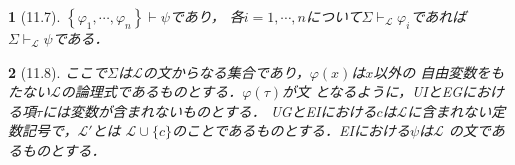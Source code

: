 \documentclass[a4j,10.5pt,oneside,openany]{jsbook}
\theoremstyle{mystyle}
\newtheorem{thm}{\color{DarkMidnightBlue}{定理}}[section]
\begin{document}
	\begin{screen}
		\begin{thm}[11.7]
			$\left\{\varphi_{1},\cdots,\varphi_{n}\right\} \vdash \psi$であり，
			各$i = 1,\cdots,n$について$\Sigma \vdash_{\mathcal{L}} \varphi_{i}$であれば
			$\Sigma \vdash_{\mathcal{L}} \psi$である．
		\end{thm}
	\end{screen}
	
	\begin{screen}
		\begin{thm}[11.8]
			ここで$\Sigma$は$\mathcal{L}$の文からなる集合であり，$\varphi(x)$は$x$以外の
			自由変数をもたない$\mathcal{L}$の論理式であるものとする．$\varphi(\tau)$が文
			となるように，UIとEGにおける項$\tau$には変数が含まれないものとする．
			UGとEIにおける$c$は$\mathcal{L}$に含まれない定数記号で，$\mathcal{L}'$とは
			$\mathcal{L} \cup \{c\}$のことであるものとする．EIにおける$\psi$は$\mathcal{L}$
			の文であるものとする．
		\end{thm}
	\end{screen}
\end{document}
